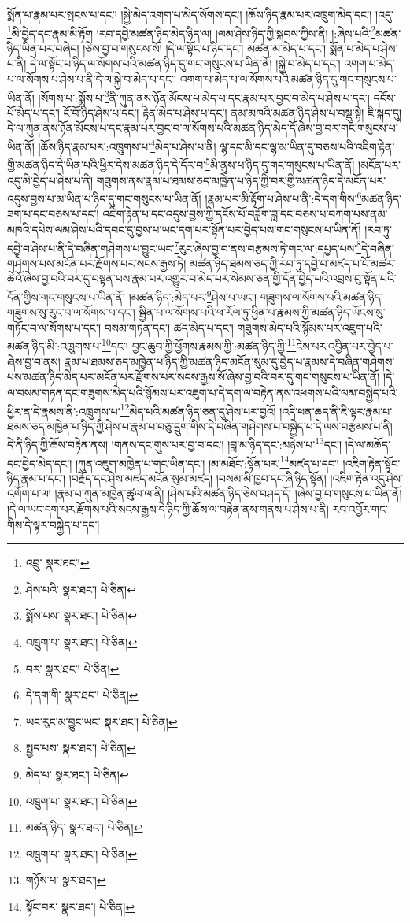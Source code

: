 སྨོན་པ་རྣམ་པར་སྤངས་པ་དང་། །སྐྱེ་མེད་འགག་པ་མེད་སོགས་དང་། །ཆོས་ཉིད་རྣམ་པར་འཁྲུག་མེད་དང་། །འདུ་\footnote{འབྲུ་  སྣར་ཐང་། }མི་བྱེད་དང་རྣམ་མི་རྟོག །རབ་དབྱེ་མཚན་ཉིད་མེད་ཉིད་ལ། །ལམ་ཤེས་ཉིད་ཀྱི་སྐབས་ཀྱིས་ནི། །:ཞེས་པའི་\footnote{ཤེས་པའི་  སྣར་ཐང་།  པེ་ཅིན། }མཚན་ཉིད་ཡིན་པར་བཞེད། །ཅེས་བྱ་བ་གསུངས་སོ། །དེ་ལ་སྟོང་པ་ཉིད་དང་། མཚན་མ་མེད་པ་དང་། སྨོན་པ་མེད་པ་ཤེས་པ་ནི། དེ་ལ་སྟོང་པ་ཉིད་ལ་སོགས་པའི་མཚན་ཉིད་དུ་གང་གསུངས་པ་ཡིན་ནོ། །སྐྱེ་བ་མེད་པ་དང་། འགག་པ་མེད་པ་ལ་སོགས་པ་ཤེས་པ་ནི་དེ་ལ་སྐྱེ་བ་མེད་པ་དང་། འགག་པ་མེད་པ་ལ་སོགས་པའི་མཚན་ཉིད་དུ་གང་གསུངས་པ་ཡིན་ནོ། །སོགས་པ་:སྨོས་པ་\footnote{སྨོས་པས་  སྣར་ཐང་།  པེ་ཅིན། }ནི་ཀུན་ནས་ཉོན་མོངས་པ་མེད་པ་དང་རྣམ་པར་བྱང་བ་མེད་པ་ཤེས་པ་དང་། དངོས་པོ་མེད་པ་དང་། ངོ་བོ་ཉིད་ཤེས་པ་དང་། རྟེན་མེད་པ་ཤེས་པ་དང་། ནམ་མཁའི་མཚན་ཉིད་ཤེས་པ་བསྡུ་སྟེ། ཇི་སྐད་དུ། དེ་ལ་ཀུན་ནས་ཉོན་མོངས་པ་དང་རྣམ་པར་བྱང་བ་ལ་སོགས་པའི་མཚན་ཉིད་མེད་དོ་ཞེས་བྱ་བར་གང་གསུངས་པ་ཡིན་ནོ། །ཆོས་ཉིད་རྣམ་པར་:འཁྲུགས་པ་\footnote{འཁྲུག་པ་  སྣར་ཐང་།  པེ་ཅིན། }མེད་པ་ཤེས་པ་ནི། ལྷ་དང་མི་དང་ལྷ་མ་ཡིན་དུ་བཅས་པའི་འཇིག་རྟེན་གྱི་མཚན་ཉིད་དེ་ཡིན་པའི་ཕྱིར་དེས་མཚན་ཉིད་དེ་དོར་བ་\footnote{བར་  སྣར་ཐང་།  པེ་ཅིན། }མི་ནུས་པ་ཉིད་དུ་གང་གསུངས་པ་ཡིན་ནོ། །མངོན་པར་འདུ་མི་བྱེད་པ་ཤེས་པ་ནི། གཟུགས་ནས་རྣམ་པ་ཐམས་ཅད་མཁྱེན་པ་ཉིད་ཀྱི་བར་གྱི་མཚན་ཉིད་དེ་མངོན་པར་འདུས་བྱས་པ་མ་ཡིན་པ་ཉིད་དུ་གང་གསུངས་པ་ཡིན་ནོ། །རྣམ་པར་མི་རྟོག་པ་ཤེས་པ་ནི་:དེ་དག་གིས་\footnote{དེ་དག་གི་  སྣར་ཐང་།  པེ་ཅིན། }མཚན་ཉིད་ཟག་པ་དང་བཅས་པ་དང་། འཇིག་རྟེན་པ་དང་འདུས་བྱས་ཀྱི་དངོས་པོ་བཟློག་ཟླ་དང་བཅས་པ་བཀག་པས་ནམ་མཁའི་དཔེས་ལམ་ཤེས་པའི་དབང་དུ་བྱས་པ་ཡང་དག་པར་སྟོན་པར་བྱེད་པས་གང་གསུངས་པ་ཡིན་ནོ། །རབ་ཏུ་དབྱེ་བ་ཤེས་པ་ནི་དེ་བཞིན་གཤེགས་པ་བྱུང་ཡང་\footnote{ཡང་རུང་མ་བྱུང་ཡང་  སྣར་ཐང་།  པེ་ཅིན། }རུང་ཞེས་བྱ་བ་ནས་བརྩམས་ཏེ་གང་ལ་:དཔྱད་པས་\footnote{སྤྱད་པས་  སྣར་ཐང་།  པེ་ཅིན། }དེ་བཞིན་གཤེགས་པས་མངོན་པར་རྫོགས་པར་སངས་རྒྱས་ཏེ། མཚན་ཉིད་ཐམས་ཅད་ཀྱི་རབ་ཏུ་དབྱེ་བ་མཛད་པ་ངོ་མཚར་ཆེའོ་ཞེས་བྱ་བའི་བར་དུ་བསྟན་པས་རྣམ་པར་འགྱུར་བ་མེད་པར་སེམས་ཅན་གྱི་དོན་བྱེད་པའི་འབྲས་བུ་སྟོན་པའི་དོན་གྱིས་གང་གསུངས་པ་ཡིན་ནོ། །མཚན་ཉིད་:མེད་པར་\footnote{མེད་པ་  སྣར་ཐང་།  པེ་ཅིན། }ཤེས་པ་ཡང་། གཟུགས་ལ་སོགས་པའི་མཚན་ཉིད་གཟུགས་སུ་རུང་བ་ལ་སོགས་པ་དང་། སྦྱིན་པ་ལ་སོགས་པའི་ཕ་རོལ་ཏུ་ཕྱིན་པ་རྣམས་ཀྱི་མཚན་ཉིད་ཡོངས་སུ་གཏོང་བ་ལ་སོགས་པ་དང་། བསམ་གཏན་དང་། ཚད་མེད་པ་དང་། གཟུགས་མེད་པའི་སྙོམས་པར་འཇུག་པའི་མཚན་ཉིད་མི་:འཁྲུགས་པ་\footnote{འཁྲུག་པ་  སྣར་ཐང་།  པེ་ཅིན། }དང་། བྱང་ཆུབ་ཀྱི་ཕྱོགས་རྣམས་ཀྱི་:མཚན་ཉིད་ཀྱི་\footnote{མཚན་ཉིད་  སྣར་ཐང་།  པེ་ཅིན། }ངེས་པར་འབྱིན་པར་བྱེད་པ་ཞེས་བྱ་བ་ནས། རྣམ་པ་ཐམས་ཅད་མཁྱེན་པ་ཉིད་ཀྱི་མཚན་ཉིད་མངོན་སུམ་དུ་བྱེད་པ་རྣམས་དེ་བཞིན་གཤེགས་པས་མཚན་ཉིད་མེད་པར་མངོན་པར་རྫོགས་པར་སངས་རྒྱས་སོ་ཞེས་བྱ་བའི་བར་དུ་གང་གསུངས་པ་ཡིན་ནོ། །དེ་ལ་བསམ་གཏན་དང་གཟུགས་མེད་པའི་སྙོམས་པར་འཇུག་པ་དེ་དག་ལ་བརྟེན་ནས་འཕགས་པའི་ལམ་བསྐྱེད་པའི་ཕྱིར་ན་དེ་རྣམས་ནི་:འཁྲུགས་པ་\footnote{འཁྲུག་པ་  སྣར་ཐང་།  པེ་ཅིན། }མེད་པའི་མཚན་ཉིད་ཅན་དུ་ཤེས་པར་བྱའོ། །འདི་ཕན་ཆད་ནི་ཇི་ལྟར་རྣམ་པ་ཐམས་ཅད་མཁྱེན་པ་ཉིད་ཀྱི་ཤེས་པ་རྣམ་པ་བཅུ་དྲུག་གིས་དེ་བཞིན་གཤེགས་པ་བསྐྱེད་པ་དེ་ལས་བརྩམས་པ་ནི། དེ་ནི་ཉིད་ཀྱི་ཆོས་བརྟེན་ནས། །གནས་དང་གུས་པར་བྱ་བ་དང་། །བླ་མ་ཉིད་དང་:མཉེས་པ་\footnote{གཉོས་པ་  སྣར་ཐང་། }དང་། །དེ་ལ་མཆོད་དང་བྱེད་མེད་དང་། །ཀུན་འཇུག་མཁྱེན་པ་གང་ཡིན་དང་། །མ་མཐོང་:སྟོན་པར་\footnote{སྟོང་བར་  སྣར་ཐང་།  པེ་ཅིན། }མཛད་པ་དང་། །འཇིག་རྟེན་སྟོང་ཉིད་རྣམ་པ་དང་། །བརྗོད་དང་ཤེས་མཛད་མངོན་སུམ་མཛད། །བསམ་མི་ཁྱབ་དང་ཞི་ཉིད་སྟོན། །འཇིག་རྟེན་འདུ་ཤེས་འགོག་པ་ལ། །རྣམ་པ་ཀུན་མཁྱེན་ཚུལ་ལ་ནི། །ཤེས་པའི་མཚན་ཉིད་ཅེས་བཤད་དོ། །ཞེས་བྱ་བ་གསུངས་པ་ཡིན་ནོ། །དེ་ལ་ཡང་དག་པར་རྫོགས་པའི་སངས་རྒྱས་དེ་ཉིད་ཀྱི་ཆོས་ལ་བརྟེན་ནས་གནས་པ་ཤེས་པ་ནི། རབ་འབྱོར་གང་གིས་དེ་ལྟར་བསྐྱེད་པ་དང་། 